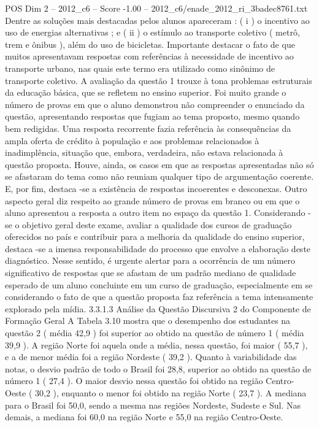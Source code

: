 \begin{textsample}{POS Dim 2 – 2012\_c6 – Score -1.00 – 2012\_c6/enade\_2012\_ri\_3badec8761.txt}
Dentre as soluções mais destacadas pelos alunos apareceram : ( i ) o incentivo ao uso de energias alternativas ; e ( ii ) o estímulo ao transporte coletivo ( metrô, trem e ônibus ), além do uso de bicicletas.
Importante destacar o fato de que muitos apresentavam respostas com referências à necessidade de incentivo ao transporte urbano, nas quais este termo era utilizado como sinônimo de transporte coletivo.
A avaliação da questão 1 trouxe à tona problemas estruturais da educação básica, que se refletem no ensino superior.
Foi muito grande o número de provas em que o aluno demonstrou não compreender o enunciado da questão, apresentando respostas que fugiam ao tema proposto, mesmo quando bem redigidas.
Uma resposta recorrente fazia referência às consequências da ampla oferta de crédito à população e aos problemas relacionados à inadimplência, situação que, embora, verdadeira, não estava relacionada à questão proposta.
Houve, ainda, os casos em que as respostas apresentadas não só se afastaram do tema como não reuniam qualquer tipo de argumentação coerente.
E, por fim, destaca -se a existência de respostas incoerentes e desconexas.
Outro aspecto geral diz respeito ao grande número de provas em branco ou em que o aluno apresentou a resposta a outro item no espaço da questão 1.
Considerando -se o objetivo geral deste exame, avaliar a qualidade dos cursos de graduação oferecidos no país e contribuir para a melhoria da qualidade do ensino superior, destaca -se a imensa responsabilidade do processo que envolve a elaboração deste diagnóstico.
Nesse sentido, é urgente alertar para a ocorrência de um número significativo de respostas que se afastam de um padrão mediano de qualidade esperado de um aluno concluinte em um curso de graduação, especialmente em se considerando o fato de que a questão proposta faz referência a tema intensamente explorado pela mídia. 3.3.1.3 Análise da Questão Discursiva 2 do Componente de Formação Geral A Tabela 3.10 mostra que o desempenho dos estudantes na questão 2 ( média 42,9 ) foi superior ao obtido na questão de número 1 ( média 39,9 ).
A região Norte foi aquela onde a média, nessa questão, foi maior ( 55,7 ), e a de menor média foi a região Nordeste ( 39,2 ).
Quanto à variabilidade das notas, o desvio padrão de todo o Brasil foi 28,8, superior ao obtido na questão de número 1 ( 27,4 ).
O maior desvio nessa questão foi obtido na região Centro-Oeste ( 30,2 ), enquanto o menor foi obtido na região Norte ( 23,7 ).
A mediana para o Brasil foi 50,0, sendo a mesma nas regiões Nordeste, Sudeste e Sul.
Nas demais, a mediana foi 60,0 na região Norte e 55,0 na região Centro-Oeste.

\end{textsample}
